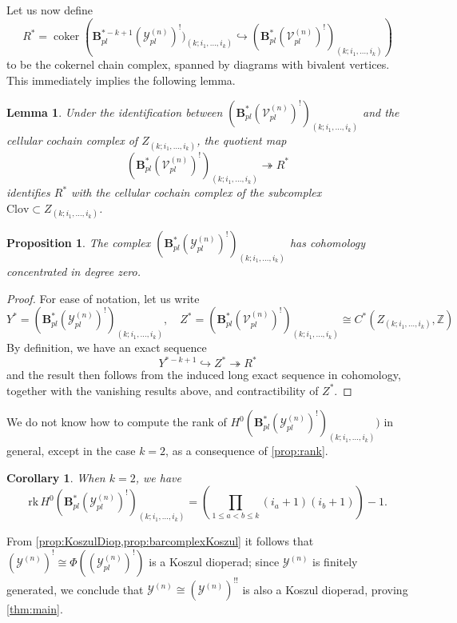 \documentclass[11pt,a4paper]{amsart}
\newcommand{\ZZ}{\ensuremath{\mathbb{Z}}}
\newcommand{\scrY}{\mathscr{Y}}
\newcommand{\scrV}{\mathscr{V}}
\newcommand{\coker}{\mathop{\mathrm{coker}}\nolimits}
\newtheorem{lemma}[theorem]{Lemma}
\newtheorem{proposition}[theorem]{Proposition}
\newtheorem{corollary}[theorem]{Corollary}
\theoremstyle{definition}
\begin{document}
\noindent Let us now define
\[ R^* = \coker\left(\mathbf{B}^{*-k+1}_{pl} (\scrY^{(n)}_{pl})^!)_{(k;i_1,\dots,i_k)} \hookrightarrow (\mathbf{B}^{*}_{pl} (\scrV^{(n)}_{pl})^!)_{(k;i_1,\dots,i_k)}\right)\]
to be the cokernel chain complex, spanned by diagrams with bivalent vertices. This immediately implies the following lemma.
\begin{lemma}
    Under the identification between $(\mathbf{B}^{*}_{pl} (\scrV^{(n)}_{pl})^!)_{(k;i_1,\dots,i_k)}$ and the cellular cochain complex of $Z_{(k;i_1,\dots,i_k)}$, the quotient map 
    \[ (\mathbf{B}^{*}_{pl} (\scrV^{(n)}_{pl})^!)_{(k;i_1,\dots,i_k)} \twoheadrightarrow R^* \] 
    identifies $R^*$ with the cellular cochain complex of the subcomplex $\mathrm{Clov} \subset Z_{(k;i_1,\dots,i_k)}$.
\end{lemma}

\begin{proposition}\label{prop:barcomplexKoszul}
    The complex $(\mathbf{B}^*_{pl} (\scrY^{(n)}_{pl})^!)_{(k;i_1,\dots,i_k)}$ has cohomology concentrated in degree zero.
\end{proposition}
\begin{proof}
    For ease of notation, let us write
    \[ Y^* = (\mathbf{B}^*_{pl} (\mathscr{Y}^{(n)}_{pl})^!)_{(k;i_1,\dots,i_k)}, \quad Z^* = (\mathbf{B}^*_{pl} (\mathscr{V}^{(n)}_{pl})^!)_{(k;i_1,\dots,i_k)} \cong C^*(Z_{(k;i_1,\dots,i_k)},\ZZ) \]
    By definition, we have an exact sequence
    \[ Y^{*-k+1} \hookrightarrow Z^* \twoheadrightarrow R^* \]
    and the result then follows from the induced long exact sequence in cohomology, together with the vanishing results above, and contractibility of $Z^*$.
\end{proof}
\noindent We do not know how to compute the rank of $H^0(\mathbf{B}^{*}_{pl} (\scrY^{(n)}_{pl})^!)_{(k;i_1,\dots,i_k)})$ in general, except in the case $k=2$, as a consequence of \cref{prop:rank}.
\begin{corollary}
    When $k=2$, we have
    \[ \mathrm{rk}\,H^0(\mathbf{B}^{*}_{pl} (\scrY^{(n)}_{pl})^!)_{(k;i_1,\dots,i_k)} = \left(\prod_{1 \le a < b \le k} (i_a+1)(i_b+1)\right) - 1.\] 
\end{corollary}
\noindent From \cref{prop:KoszulDiop,prop:barcomplexKoszul} it follows that $(\scrY^{(n)})^! \cong \Phi((\scrY^{(n)}_{pl})^!)$ is a Koszul dioperad; since $\scrY^{(n)}$ is finitely generated, we conclude that $\scrY^{(n)} \cong (\scrY^{(n)})^{!!}$ is also a Koszul dioperad, proving \cref{thm:main}.

\printbibliography

\Addresses
\end{document}
